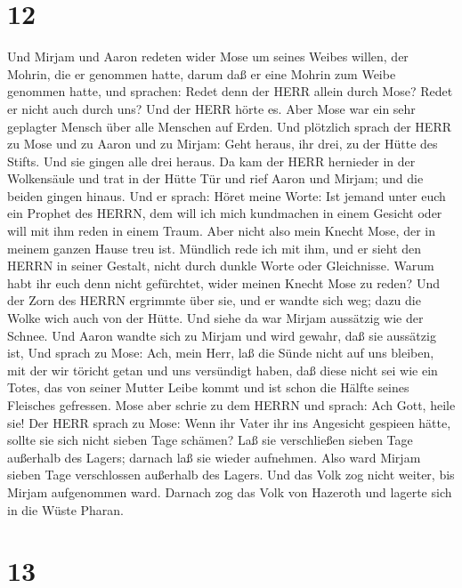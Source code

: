\hypertarget{section-11}{%
\section{12}\label{section-11}}

 Und Mirjam und Aaron redeten wider Mose um seines Weibes
willen, der Mohrin, die er genommen hatte, darum daß er eine Mohrin zum
Weibe genommen hatte,  und sprachen: Redet denn der HERR
allein durch Mose? Redet er nicht auch durch uns? Und der HERR hörte es.
 Aber Mose war ein sehr geplagter Mensch über alle Menschen
auf Erden.  Und plötzlich sprach der HERR zu Mose und zu
Aaron und zu Mirjam: Geht heraus, ihr drei, zu der Hütte des Stifts. Und
sie gingen alle drei heraus.  Da kam der HERR hernieder in
der Wolkensäule und trat in der Hütte Tür und rief Aaron und Mirjam; und
die beiden gingen hinaus.  Und er sprach: Höret meine Worte:
Ist jemand unter euch ein Prophet des HERRN, dem will ich mich
kundmachen in einem Gesicht oder will mit ihm reden in einem Traum.
 Aber nicht also mein Knecht Mose, der in meinem ganzen
Hause treu ist.  Mündlich rede ich mit ihm, und er sieht den
HERRN in seiner Gestalt, nicht durch dunkle Worte oder Gleichnisse.
Warum habt ihr euch denn nicht gefürchtet, wider meinen Knecht Mose zu
reden?  Und der Zorn des HERRN ergrimmte über sie, und er
wandte sich weg;  dazu die Wolke wich auch von der Hütte.
Und siehe da war Mirjam aussätzig wie der Schnee. Und Aaron wandte sich
zu Mirjam und wird gewahr, daß sie aussätzig ist,  Und
sprach zu Mose: Ach, mein Herr, laß die Sünde nicht auf uns bleiben, mit
der wir töricht getan und uns versündigt haben,  daß diese
nicht sei wie ein Totes, das von seiner Mutter Leibe kommt und ist schon
die Hälfte seines Fleisches gefressen.  Mose aber schrie zu
dem HERRN und sprach: Ach Gott, heile sie!  Der HERR sprach
zu Mose: Wenn ihr Vater ihr ins Angesicht gespieen hätte, sollte sie
sich nicht sieben Tage schämen? Laß sie verschließen sieben Tage
außerhalb des Lagers; darnach laß sie wieder aufnehmen. 
Also ward Mirjam sieben Tage verschlossen außerhalb des Lagers. Und das
Volk zog nicht weiter, bis Mirjam aufgenommen ward. 
Darnach zog das Volk von Hazeroth und lagerte sich in die Wüste Pharan.

\hypertarget{section-12}{%
\section{13}\label{section-12}}


